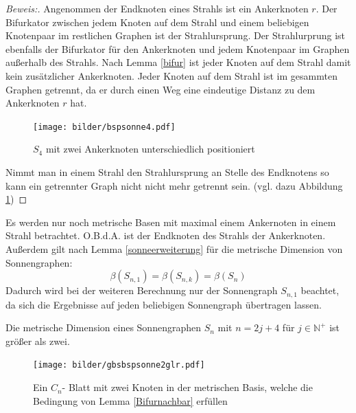 \begin{proof}[Beweis:]
Angenommen der Endknoten eines Strahls ist ein Ankerknoten $r$. Der Bifurkator zwischen jedem Knoten auf dem Strahl und einem beliebigen Knotenpaar im restlichen Graphen ist der Strahlursprung. Der Strahlurprung ist ebenfalls der Bifurkator für den Ankerknoten und jedem Knotenpaar im Graphen außerhalb des Strahls. Nach Lemma \ref{bifur} ist jeder Knoten auf dem Strahl damit kein zusätzlicher Ankerknoten. Jeder Knoten auf dem Strahl ist im gesammten Graphen getrennt, da er durch einen Weg eine eindeutige Distanz zu dem Ankerknoten $r$ hat.\begin{figure}[h!]
		\centering
 		 \texttt{[image: bilder/bspsonne4.pdf]}
   \caption{$S_4$ mit zwei Ankerknoten unterschiedlich positioniert}
   \label{s4}
   \end{figure}
Nimmt man in einem Strahl den Strahlursprung an Stelle des Endknotens so kann ein getrennter Graph nicht nicht mehr getrennt sein. (vgl. dazu Abbildung \ref{s4})
\end{proof}
\begin{bem}
Es werden nur noch metrische Basen mit maximal einem Ankernoten in einem Strahl betrachtet. O.B.d.A. ist der Endknoten des Strahls der Ankerknoten. Außerdem gilt nach Lemma \ref{sonneerweiterung} für die metrische Dimension von Sonnengraphen: $$\beta(S_{n,1})=\beta(S_{n,k})=\beta(S_n)$$
Dadurch wird bei der weiteren Berechnung nur der Sonnengraph $S_{n,1}$ beachtet, da sich die Ergebnisse auf jeden beliebigen Sonnengraph übertragen lassen. 
\end{bem}
\begin{lem}
\label{mdgr2}
Die metrische Dimension eines Sonnengraphen $S_{n}$ mit $n = 2j+4$ für $j \in \mathbb{N}^+$ ist größer als zwei. 
\end{lem}
\vspace{-8mm}
 \begin{figure}[h!]
		\centering
 		 \texttt{[image: bilder/gbsbspsonne2glr.pdf]}
   \caption{Ein $C_{n}$- Blatt mit zwei Knoten in der metrischen Basis, welche die Bedingung von Lemma \ref{Bifurnachbar} erfüllen}
  	 \end{figure}
\vspace{-4mm}
  	 ~\linebreak

